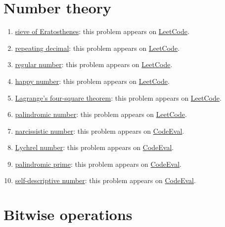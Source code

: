 \section{Number theory}
\begin{enumerate}
\item \href{https://en.wikipedia.org/wiki/Sieve_of_Eratosthenes}{sieve of Eratosthenes}: this problem appears on \href{https://leetcode.com/problems/count-primes/}{LeetCode}.
\item \href{https://en.wikipedia.org/wiki/Repeating_decimal#Reciprocals_of_integers_not_co-prime_to_10}{repeating decimal}: this problem appears on \href{https://leetcode.com/problems/fraction-to-recurring-decimal/}{LeetCode}.
\item \href{https://en.wikipedia.org/wiki/Regular_number#Algorithms}{regular number}: this problem appears on \href{https://leetcode.com/problems/ugly-number-ii/}{LeetCode}.
\item \href{https://en.wikipedia.org/wiki/Happy_number}{happy number}: this problem appears on \href{https://leetcode.com/problems/happy-number/}{LeetCode}.
\item \href{https://en.wikipedia.org/wiki/Lagrange\%27s_four-square_theorem}{Lagrange's four-square theorem}: this problem appears on \href{https://leetcode.com/problems/perfect-squares/}{LeetCode}.
\item \href{https://en.wikipedia.org/wiki/Palindromic_number}{palindromic number}: this problem appears on \href{https://leetcode.com/problems/palindrome-number/}{LeetCode}.
\item \href{https://en.wikipedia.org/wiki/Narcissistic_number}{narcissistic number}: this problem appears on \href{https://www.codeeval.com/open_challenges/82/}{CodeEval}.
\item \href{https://en.wikipedia.org/wiki/Lychrel_number}{Lychrel number}: this problem appears on \href{https://www.codeeval.com/public_sc/45/}{CodeEval}.
\item \href{https://en.wikipedia.org/wiki/Palindromic_prime}{palindromic prime}: this problem appears on \href{https://www.codeeval.com/open_challenges/3/}{CodeEval}.
\item \href{https://en.wikipedia.org/wiki/Self-descriptive_number}{self-descriptive number}: this problem appears on \href{https://www.codeeval.com/open_challenges/40/}{CodeEval}.
\end{enumerate}

\section{Bitwise operations}

